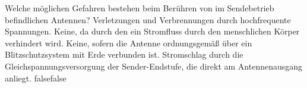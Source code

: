     {Welche möglichen Gefahren bestehen beim Berühren von im Sendebetrieb befindlichen Antennen?}
    {Verletzungen und Verbrennungen durch hochfrequente Spannungen.}
    {Keine, da durch den  ein Stromfluss durch den menschlichen Körper verhindert wird.}
    {Keine, sofern die Antenne ordnungsgemäß über ein Blitzschutzsystem mit Erde verbunden ist.}
    {Stromschlag durch die Gleichspannungsversorgung der Sender-Endstufe, die direkt am Antennenausgang anliegt.}
    {false}{false}